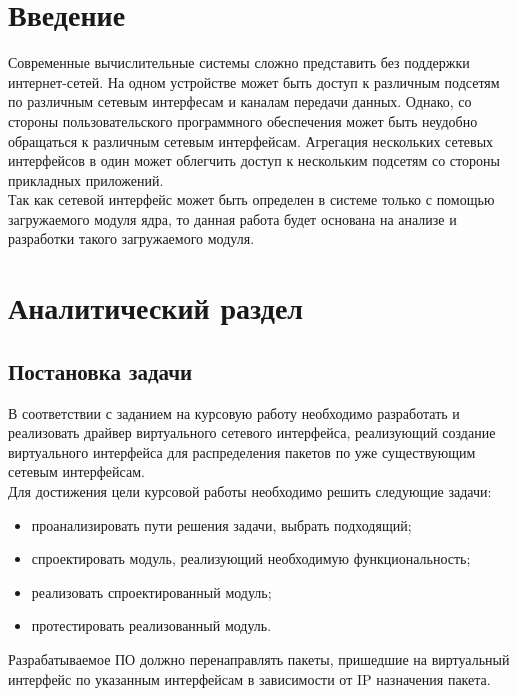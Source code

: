 \documentclass[14pt, a4paper]{extarticle}
\begin{document}
\setcounter{page}{3}

\clearpage
\tableofcontents

\clearpage
\section*{Введение}
	Современные вычислительные системы сложно представить без поддержки интернет-сетей. На одном устройстве может быть доступ к различным подсетям по различным сетевым интерфесам и каналам передачи данных. Однако, со стороны пользовательского программного обеспечения может быть неудобно обращаться к различным сетевым интерфейсам. Агрегация нескольких сетевых интерфейсов в один может облегчить доступ к нескольким подсетям со стороны прикладных приложений.\\
\indent Так как сетевой интерфейс может быть определен в системе только с помощью загружаемого модуля ядра, то данная работа будет основана на анализе и разработки такого загружаемого модуля.


\clearpage
\section{Аналитический раздел}
\subsection{Постановка задачи}
В соответствии с заданием на курсовую работу необходимо разработать
и реализовать драйвер виртуального сетевого интерфейса, реализующий создание виртуального интерфейса для распределения пакетов по уже существующим сетевым интерфейсам. \\
\indent Для достижения цели курсовой работы необходимо решить следующие задачи:
\begin{itemize}
	\item проанализировать пути решения задачи, выбрать подходящий;
	\item спроектировать модуль, реализующий необходимую функциональность;
	\item реализовать спроектированный модуль;
	\item протестировать реализованный модуль.
\end{itemize}
\indent \indent Разрабатываемое ПО должно перенаправлять пакеты, пришедшие на виртуальный интерфейс по указанным интерфейсам в зависимости от IP назначения пакета.
\end{document}
